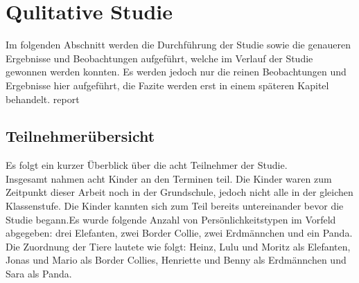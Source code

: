 \chapter{Qulitative Studie}
	Im folgenden Abschnitt werden die Durchführung der Studie sowie die genaueren Ergebnisse und Beobachtungen aufgeführt, welche im Verlauf der Studie gewonnen werden konnten. Es werden jedoch nur die reinen Beobachtungen und Ergebnisse hier aufgeführt, die Fazite werden erst in einem späteren Kapitel behandelt.
	\gls{report}
\section{Teilnehmerübersicht}
	Es folgt ein kurzer Überblick über die acht Teilnehmer der Studie.\\
	Insgesamt nahmen acht Kinder an den Terminen teil. Die Kinder waren zum Zeitpunkt dieser Arbeit noch in der Grundschule, jedoch nicht alle in der gleichen Klassenstufe. Die Kinder kannten sich zum Teil bereits untereinander bevor die Studie begann.Es wurde folgende Anzahl von Persönlichkeitstypen im Vorfeld abgegeben: drei Elefanten, zwei Border Collie, zwei Erdmännchen und ein Panda. Die Zuordnung der Tiere lautete wie folgt: Heinz, Lulu und Moritz als Elefanten, Jonas und Mario als Border Collies, Henriette und Benny als Erdmännchen und Sara als Panda.\\
	
